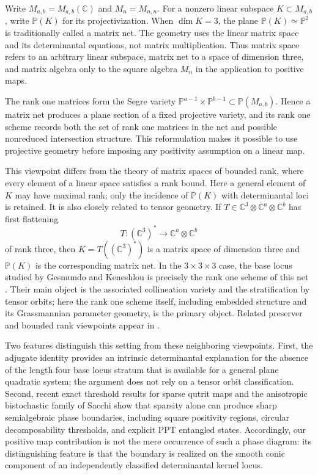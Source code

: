 \documentclass[11pt]{amsart}
\newcommand{\chg}[1]{#1}
\newcommand{\newrev}[1]{#1}
\theoremstyle{plain}
\theoremstyle{definition}
\theoremstyle{remark}
\begin{document}
Write $M_{a,b}=M_{a,b}(\mathbb C)$ and $M_n=M_{n,n}$. For a nonzero linear subspace $K\subset M_{a,b}$, write $\mathbb P(K)$ for its projectivization. When $\dim K=3$, the plane $\mathbb P(K)\simeq\mathbb P^2$ is traditionally called a matrix net. The geometry uses the linear matrix space and its determinantal equations, not matrix multiplication. Thus matrix space refers to an arbitrary linear subspace, matrix net to a space of dimension three, and matrix algebra only to the square algebra $M_n$ in the application to positive maps.

\chg{The rank one matrices form the Segre variety $\mathbb P^{a-1}\times\mathbb P^{b-1}\subset\mathbb P(M_{a,b})$. Hence a matrix net produces a plane section of a fixed projective variety, and its rank one scheme records both the set of rank one matrices in the net and possible nonreduced intersection structure. This reformulation makes it possible to use projective geometry before imposing any positivity assumption on a linear map.}

This viewpoint differs from \chg{the theory of matrix spaces of bounded rank}, where every element of a linear space satisfies a rank bound. Here a general element of $K$ may have maximal rank; only the incidence of $\mathbb P(K)$ with determinantal loci is retained. It is also closely related to tensor geometry. If $T\in\mathbb C^3\otimes\mathbb C^a\otimes\mathbb C^b$ has first flattening
\[
T:(\mathbb C^3)^*\longrightarrow\mathbb C^a\otimes\mathbb C^b
\]
of rank three, then $K=T((\mathbb C^3)^*)$ is a matrix space of dimension three and $\mathbb P(K)$ is the corresponding matrix net. In the $3\times3\times3$ case, the base locus studied by Gesmundo and Keneshlou is precisely the \chg{rank one} scheme of this net \cite{GesmundoKeneshlou2026}. Their main object is the associated collineation variety and \chg{the stratification by tensor orbits}; here the \chg{rank one} scheme itself, including embedded structure and its Grassmannian parameter geometry, is the primary object. Related preserver and bounded rank viewpoints appear in \cite{GesmundoHanLovitz2025,HuangLandsberg2026}.

Two features distinguish this setting from these neighboring viewpoints. First, the adjugate identity \newrev{provides an intrinsic determinantal explanation for the absence of} the \chg{length four base locus stratum} that is available for a general plane quadratic system; \newrev{the argument does not rely on a tensor orbit classification.} Second, recent \chg{exact threshold} results for sparse qutrit maps \chg{\cite{PoderiniEtAl2026}} \newrev{and the anisotropic bistochastic family of Sacchi \cite{Sacchi2026}} show that sparsity alone can produce sharp semialgebraic phase boundaries, including square positivity regions, circular decomposability thresholds, and explicit PPT entangled states. \newrev{Accordingly, our positive map contribution is not the mere occurrence of such a phase diagram: its distinguishing feature is that the boundary is realized on the smooth conic component of an independently classified determinantal kernel locus.}
\end{document}
